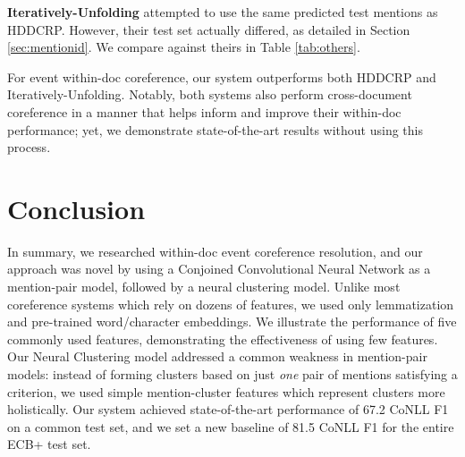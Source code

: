 \documentclass[11pt,a4paper]{article}
\begin{document}
\textbf{Iteratively-Unfolding} attempted to use the same predicted test mentions as HDDCRP.  However, their test set actually differed, as detailed in Section \ref{sec:mentionid}.  We compare against theirs in Table \ref{tab:others}.

For event within-doc coreference, our system outperforms both HDDCRP and Iteratively-Unfolding.  Notably, both systems also perform cross-document coreference in a manner that helps inform and improve their within-doc performance; yet, we demonstrate state-of-the-art results without using this process.

\section{Conclusion}
In summary, we researched within-doc event coreference resolution, and our approach was novel by using a Conjoined Convolutional Neural Network as a mention-pair model, followed by a neural clustering model.  Unlike most coreference systems which rely on dozens of features, we used only lemmatization and pre-trained word/character embeddings.  We illustrate the performance of five commonly used features, demonstrating the effectiveness of using few features.  Our Neural Clustering model addressed a common weakness in mention-pair models: instead of forming clusters based on just \textit{one} pair of mentions satisfying a criterion, we used simple mention-cluster features which represent clusters more holistically.  Our system achieved state-of-the-art performance of 67.2 CoNLL F1 on a common test set, and we set a new baseline of 81.5 CoNLL F1 for the entire ECB+ test set.   

%
%


\end{document}
